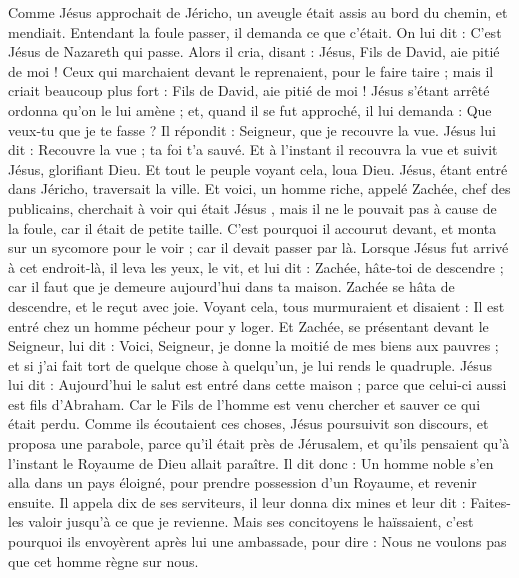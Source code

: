\begin{multicols}{2}
Comme Jésus approchait de Jéricho, un aveugle était assis au bord du chemin, et mendiait.
Entendant la foule passer, il demanda ce que c'était.
On lui dit : C’est Jésus de Nazareth qui passe.
Alors il cria, disant : Jésus, Fils de David, aie pitié de moi !
Ceux qui marchaient devant le reprenaient, pour le faire taire ; mais il criait beaucoup plus fort : Fils de David, aie pitié de moi !
Jésus s'étant arrêté ordonna qu'on le lui amène ; et, quand il se fut approché,
il lui demanda : Que veux-tu que je te fasse ? Il répondit : Seigneur, que je recouvre la vue.
Jésus lui dit : Recouvre la vue ; ta foi t'a sauvé.
Et à l'instant il recouvra la vue et suivit Jésus, glorifiant Dieu. Et tout le peuple voyant cela, loua Dieu.
\VerseOne{}Jésus, étant entré dans Jéricho, traversait la ville.
Et voici, un homme riche, appelé Zachée, chef des publicains, cherchait à voir qui était Jésus ,
mais il ne le pouvait pas à cause de la foule, car il était de petite taille.
C'est pourquoi il accourut devant, et monta sur un sycomore pour le voir ; car il devait passer par là.
Lorsque Jésus fut arrivé à cet endroit-là, il leva les yeux, le vit, et lui dit : Zachée, hâte-toi de descendre ; car il faut que je demeure aujourd'hui dans ta maison.
Zachée se hâta de descendre, et le reçut avec joie.
Voyant cela, tous murmuraient et disaient : Il est entré chez un homme pécheur pour y loger.
Et Zachée, se présentant devant le Seigneur, lui dit : Voici, Seigneur, je donne la moitié de mes biens aux pauvres ; et si j'ai fait tort de quelque chose à quelqu'un, je lui rends le quadruple.
Jésus lui dit : Aujourd'hui le salut est entré dans cette maison ; parce que celui-ci aussi est fils d'Abraham.
Car le Fils de l'homme est venu chercher et sauver ce qui était perdu.
Comme ils écoutaient ces choses, Jésus poursuivit son discours, et proposa une parabole, parce qu'il était près de Jérusalem, et qu'ils pensaient qu'à l'instant le Royaume de Dieu allait paraître.
Il dit donc : Un homme noble s'en alla dans un pays éloigné, pour prendre possession d'un Royaume, et revenir ensuite.
Il appela dix de ses serviteurs, il leur donna dix mines et leur dit : Faites-les valoir jusqu'à ce que je revienne.
Mais ses concitoyens le haïssaient, c'est pourquoi ils envoyèrent après lui une ambassade, pour dire : Nous ne voulons pas que cet homme règne sur nous.

\end{multicols}
